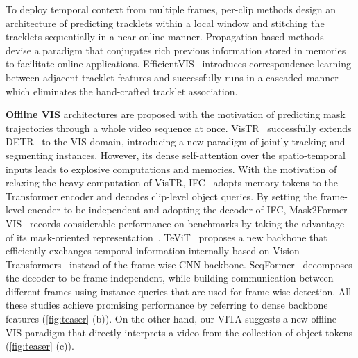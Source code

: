 \documentclass{article}
\begin{document}
To deploy temporal context from multiple frames, per-clip methods \cite{stem-seg, MaskProp} design an architecture of predicting tracklets within a local window and stitching the tracklets sequentially in a near-online manner.
Propagation-based methods~\cite{CompFeat, PCAN, VISOLO} devise a paradigm that conjugates rich previous information stored in memories to facilitate online applications.
EfficientVIS~\cite{EfficientVIS} introduces correspondence learning between adjacent tracklet features and successfully runs in a cascaded manner which eliminates the hand-crafted tracklet association.


\textbf{Offline VIS } architectures are proposed with the motivation of predicting mask trajectories through a whole video sequence at once. 
VisTR~\cite{VisTR} successfully extends DETR~\cite{DETR} to the VIS domain, introducing a new paradigm of jointly tracking and segmenting instances. However, its dense self-attention over the spatio-temporal inputs leads to explosive computations and memories.
With the motivation of relaxing the heavy computation of VisTR, IFC~\cite{IFC} adopts memory tokens to the Transformer encoder and decodes clip-level object queries.
By setting the frame-level encoder to be independent and adopting the decoder of IFC, Mask2Former-VIS~\cite{Mask2Former-VIS} records considerable performance on benchmarks by taking the advantage of its mask-oriented representation~\cite{Mask2Former}. TeViT~\cite{TeViT} proposes a new backbone that efficiently exchanges temporal information internally based on Vision Transformers~\cite{ViT} instead of the frame-wise CNN backbone.
SeqFormer~\cite{SeqFormer} decomposes the decoder to be frame-independent, while building communication between different frames using instance queries that are used for frame-wise detection.
All these studies achieve promising performance by referring to dense backbone features (\cref{fig:teaser} (b)).
On the other hand, our VITA suggests a new offline VIS paradigm that directly interprets a video from the collection of object tokens (\cref{fig:teaser} (c)).
\end{document}
